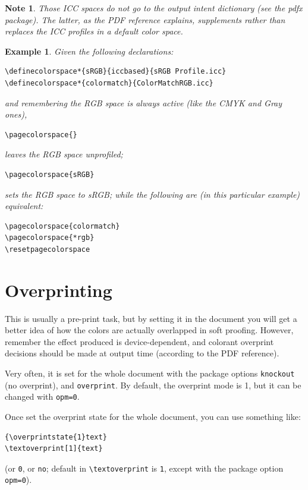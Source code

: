 \documentclass[a4paper]{ltxguide}
\newtheorem{note}{Note}
\newtheorem{example}{Example}
\begin{document}
\begin{note}
  Those ICC spaces do not go to the output intent dictionary (see
  the \textsf{pdfx} package). The latter, as the PDF reference
  explains, supplements rather than replaces the ICC profiles in a
  default color space.
\end{note}

\begin{example}
  Given the following declarations:
\begin{verbatim}
\definecolorspace*{sRGB}{iccbased}{sRGB Profile.icc}
\definecolorspace*{colormatch}{ColorMatchRGB.icc}
\end{verbatim}
  and remembering the RGB space is always active (like the CMYK and
  Gray ones),
\begin{verbatim}
\pagecolorspace{}
\end{verbatim}
leaves the RGB space unprofiled;
\begin{verbatim}
\pagecolorspace{sRGB}
\end{verbatim}
sets the RGB space to sRGB; while the following are (in this
particular example) equivalent:
\begin{verbatim}
\pagecolorspace{colormatch}
\pagecolorspace{*rgb}
\resetpagecolorspace
\end{verbatim}

\end{example}

\section{Overprinting}

This is usually a pre-print task, but by setting it in the document
you will get a better idea of how the colors are actually overlapped
in soft proofing. However, remember the effect produced is
device-dependent, and colorant overprint decisions should be made at
output time (according to the PDF reference).

Very often, it is set for the whole document with the package options
\verb|knockout| (no overprint), and \verb|overprint|. By default, the
overprint mode is 1, but it can be changed with \verb|opm=0|.

Once set the overprint state for the whole document, you can use
something like:
\begin{verbatim}
{\overprintstate{1}text}
\textoverprint[1]{text}
\end{verbatim}
(or \verb|0|, or \verb|no|; default in \verb|\textoverprint| is
\verb|1|, except with the package option \verb|opm=0|).
\end{document}
